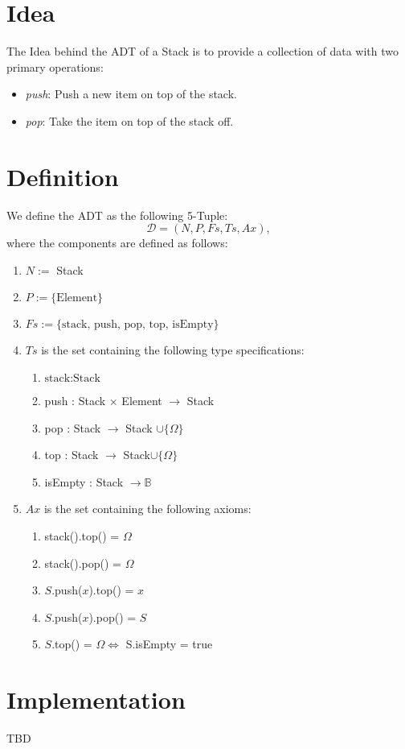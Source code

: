 \documentclass{article}
\begin{document}
\section*{Idea}
The Idea behind the ADT of a Stack is to provide a collection of data with two primary operations:

\begin{itemize}
	\item \emph{push}: Push a new item on top of the stack.
	\item \emph{pop}: Take the item on top of the stack off.
\end{itemize}


\section*{Definition}

We define the ADT as the following 5-Tuple:
\[\mathcal{D} = (N, P, Fs, Ts, Ax),\]
where the components are defined as follows:

\begin{enumerate}
 \item \(N :=\) Stack
 \item \(P := \{ \text{Element} \}\)
 \item \(Fs := \{ \text{stack, push, pop, top, isEmpty} \}\)
 \item \(Ts\) is the set containing the following type specifications:
	\begin{enumerate}
		\item \( \text{stack} : \text{Stack} \)
		\item push : Stack \(\times\) Element \(\rightarrow\) Stack
		\item pop : Stack \(\rightarrow\) Stack \(\cup \{\Omega\}\)
		\item top : Stack \(\rightarrow\) Stack\(\cup \{\Omega\}\)
		\item isEmpty : Stack \(\rightarrow \mathbb{B}\)
	\end{enumerate}
 \item \(Ax\) is the set containing the following axioms:
	\begin{enumerate}
		\item stack().top() = \(\Omega\)
  \item stack().pop() = \(\Omega\)
  \item \(S\).push(\(x\)).top() = \(x\)
  \item \(S\).push(\(x\)).pop() = \(S\)
  \item \(S\).top() = \(\Omega \iff\) S.isEmpty = true
	\end{enumerate}
\end{enumerate}


\section*{Implementation}
TBD
\end{document}
